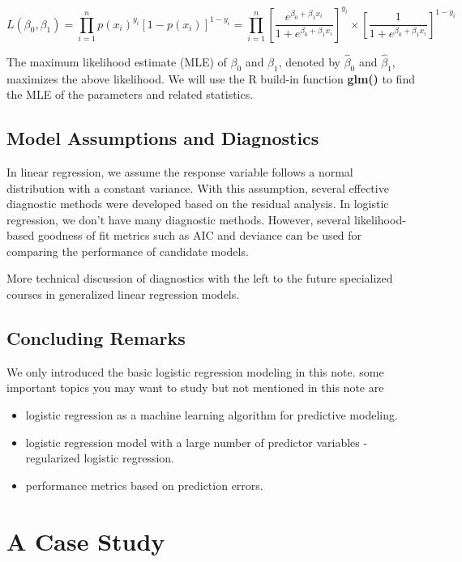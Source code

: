 \documentclass[
]{book}
\begin{document}
\[
L(\beta_0, \beta_1)= \prod_{i=1}^n p(x_i)^{y_i}\left[1 - p(x_i) \right]^{1-y_i} 
= \prod_{i=1}^n \left[\frac{e^{\beta_0 + \beta_1 x_i}}{1 + e^{\beta_0 + \beta_1 x_i}}\right]^{y_i}\times \left[\frac{1}{1 + e^{\beta_0 + \beta_1 x_i}} \right]^{1-y_i}
\]

The maximum likelihood estimate (MLE) of \(\beta_0\) and \(\beta_1\), denoted by \(\hat{\beta}_0\) and \(\hat{\beta}_1\), maximizes the above likelihood. We will use the R build-in function \textbf{glm()} to find the MLE of the parameters and related statistics.

\hypertarget{model-assumptions-and-diagnostics}{%
\subsection{Model Assumptions and Diagnostics}\label{model-assumptions-and-diagnostics}}

In linear regression, we assume the response variable follows a normal distribution with a constant variance. With this assumption, several effective diagnostic methods were developed based on the residual analysis. In logistic regression, we don't have many diagnostic methods. However, several likelihood-based goodness of fit metrics such as AIC and deviance can be used for comparing the performance of candidate models.

More technical discussion of diagnostics with the left to the future specialized courses in generalized linear regression models.

\hypertarget{concluding-remarks-1}{%
\subsection{Concluding Remarks}\label{concluding-remarks-1}}

We only introduced the basic logistic regression modeling in this note. some important topics you may want to study but not mentioned in this note are

\begin{itemize}
\item
  logistic regression as a machine learning algorithm for predictive modeling.
\item
  logistic regression model with a large number of predictor variables - regularized logistic regression.
\item
  performance metrics based on prediction errors.
\end{itemize}

\hypertarget{a-case-study}{%
\section{A Case Study}\label{a-case-study}}
\end{document}
